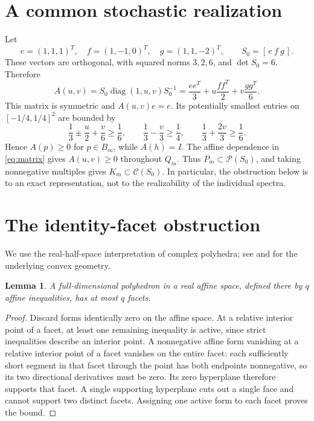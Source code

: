 \documentclass[11pt,a4paper]{article}
\newtheorem{lemma}[theorem]{Lemma}
\newcommand{\diag}{\operatorname{diag}}
\begin{document}
\section{A common stochastic realization}
Let
\[
 e=(1,1,1)^T,\quad f=(1,-1,0)^T,\quad g=(1,1,-2)^T,
 \qquad S_0=[\,e\ f\ g\,].
\]
These vectors are orthogonal, with squared norms $3,2,6$, and
$\det S_0=6$. Therefore
\begin{equation}\label{eq:matrix}
 A(u,v)=S_0\diag(1,u,v)S_0^{-1}
       =\frac{ee^T}{3}+u\frac{ff^T}{2}+v\frac{gg^T}{6}.
\end{equation}
This matrix is symmetric and $A(u,v)e=e$. Its potentially smallest entries
on $[-1/4,1/4]^2$ are bounded by
\[
 \frac13\mathbin{\pm}\frac u2+\frac v6\geq\frac16,\qquad
 \frac13-\frac v3\geq\frac14,\qquad
 \frac13+\frac{2v}{3}\geq\frac16.
\]
Hence $A(p)\geq0$ for $p\in B_m$, while $A(h)=I$.
The affine dependence in \eqref{eq:matrix} gives $A(u,v)\geq0$ throughout
$Q_m$. Thus $P_m\subset\mathcal P(S_0)$, and taking nonnegative multiples
gives $K_m\subset\mathcal C(S_0)$.
In particular, the obstruction below is to an exact representation, not
to the realizability of the individual spectra.

\section{The identity-facet obstruction}
We use the real-half-space interpretation of complex polyhedra; see
\cite{Klee59} and \cite[Section~3.1]{JP25} for the underlying convex geometry.
\begin{lemma}\label{lem:facets}
A full-dimensional polyhedron in a real affine space, defined there by
$q$ affine inequalities, has at most $q$ facets.
\end{lemma}
\begin{proof}
Discard forms identically zero on the affine space. At a relative interior
point of a facet, at least one remaining inequality is active, since strict
inequalities describe an interior point. A nonnegative affine form vanishing
at a relative interior point of a facet vanishes on the entire facet:
each sufficiently short segment in that facet through the point has both
endpoints nonnegative, so its two directional derivatives must be zero.
Its zero hyperplane therefore supports that facet. A single supporting
hyperplane cuts out a single face and cannot support two distinct facets.
Assigning one active form to each facet proves the bound.
\end{proof}
\end{document}
